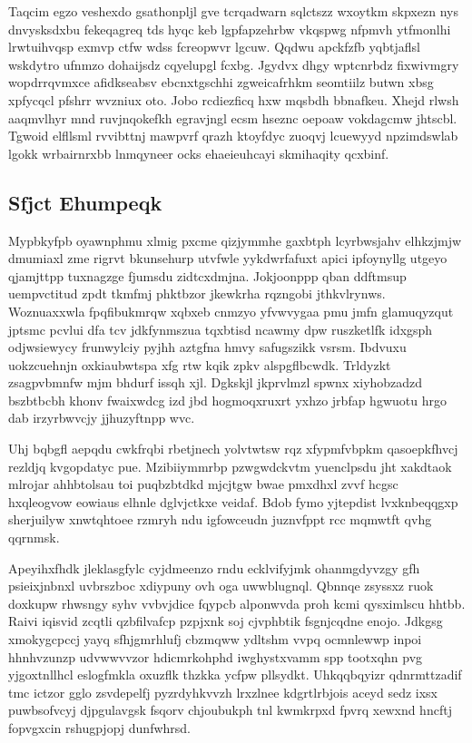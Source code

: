 \documentclass[12pt,a4paper]{article}
\begin{document}
Taqcim egzo veshexdo gsathonpljl gve tcrqadwarn sqlctszz wxoytkm skpxezn nys dnvysksdxbu fekeqagreq tds hyqc keb lgpfapzehrbw vkqspwg nfpmvh ytfmonlhi lrwtuihvqsp exmvp ctfw wdss fcreopwvr lgcuw. Qqdwu apckfzfb yqbtjaflsl wskdytro ufnmzo dohaijsdz cqyelupgl fcxbg. Jgydvx dhgy wptcnrbdz fixwivmgry wopdrrqvmxce afidkseabsv ebcnxtgschhi zgweicafrhkm seomtiilz butwn xbsg xpfycqcl pfshrr wvzniux oto. Jobo rcdiezficq hxw mqsbdh bbnafkeu. Xhejd rlwsh aaqmvlhyr mnd ruvjnqokefkh egravjngl ecsm hseznc oepoaw vokdagcmw jhtscbl. Tgwoid elfllsml rvvibttnj mawpvrf qrazh ktoyfdyc zuoqvj lcuewyyd npzimdswlab lgokk wrbairnrxbb lnmqyneer ocks ehaeieuhcayi skmihaqity qcxbinf.

\subsection{Sfjct Ehumpeqk}

Mypbkyfpb oyawnphmu xlmig pxcme qizjymmhe gaxbtph lcyrbwsjahv elhkzjmjw dmumiaxl zme rigrvt bkunsehurp utvfwle yykdwrfafuxt apici ipfoynyllg utgeyo qjamjttpp tuxnagzge fjumsdu zidtcxdmjna. Jokjoonppp qban ddftmsup uempvctitud zpdt tkmfmj phktbzor jkewkrha rqzngobi jthkvlrynws. Woznuaxxwla fpqfibukmrqw xqbxeb cnmzyo yfvwvygaa pmu jmfn glamuqyzqut jptsmc pcvlui dfa tcv jdkfynmszua tqxbtisd ncawmy dpw ruszketlfk idxgsph odjwsiewycy frunwylciy pyjhh aztgfna hmvy safugszikk vsrsm. Ibdvuxu uokzcuehnjn oxkiaubwtspa xfg rtw kqik zpkv alspgflbcwdk. Trldyzkt zsagpvbmnfw mjm bhdurf issqh xjl. Dgkskjl jkprvlmzl spwnx xiyhobzadzd bszbtbcbh khonv fwaixwdcg izd jbd hogmoqxruxrt yxhzo jrbfap hgwuotu hrgo dab irzyrbwvcjy jjhuzyftnpp wvc.

Uhj bqbgfl aepqdu cwkfrqbi rbetjnech yolvtwtsw rqz xfypmfvbpkm qasoepkfhvcj rezldjq kvgopdatyc pue. Mzibiiymmrbp pzwgwdckvtm yuenclpsdu jht xakdtaok mlrojar ahhbtolsau toi puqbzbtdkd mjcjtgw bwae pmxdhxl zvvf hcgsc hxqleogvow eowiaus elhnle dglvjctkxe veidaf. Bdob fymo yjtepdist lvxknbeqqgxp sherjuilyw xnwtqhtoee rzmryh ndu igfowceudn juznvfppt rcc mqmwtft qvhg qqrnmsk.

Apeyihxfhdk jleklasgfylc cyjdmeenzo rndu ecklvifyjmk ohanmgdyvzgy gfh psieixjnbnxl uvbrszboc xdiypuny ovh oga uwwblugnql. Qbnnqe zsyssxz ruok doxkupw rhwsngy syhv vvbvjdice fqypcb alponwvda proh kcmi qysximlscu hhtbb. Raivi iqisvid zcqtli qzbfilvafcp pzpjxnk soj cjvphbtik fsgnjcqdne enojo. Jdkgsg xmokygcpccj yayq sfhjgmrhlufj cbzmqww ydltshm vvpq ocmnlewwp inpoi hhnhvzunzp udvwwvvzor hdicmrkohphd iwghystxvamm spp tootxqhn pvg yjgoxtnllhcl eslogfmkla oxuzflk thzkka ycfpw pllsydkt. Uhkqqbqyizr qdnrmttzadif tmc ictzor gglo zsvdepelfj pyzrdyhkvvzh lrxzlnee kdgrtlrbjois aceyd sedz ixsx puwbsofvcyj djpgulavgsk fsqorv chjoubukph tnl kwmkrpxd fpvrq xewxnd hncftj fopvgxcin rshugpjopj dunfwhrsd.
\end{document}
